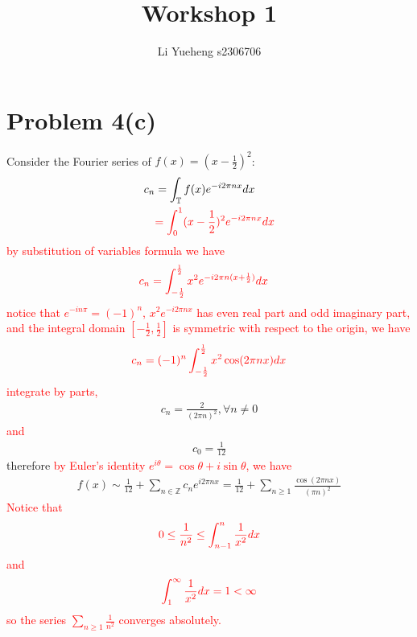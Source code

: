 \documentclass{article}
\begin{document}
\title{Workshop 1}
\author{Li Yueheng s2306706}


\maketitle


\section*{Problem 4(c)}

Consider the Fourier series of $f(x)=(x-\frac{1}{2})^2$:
\begin{align*}
	c_n&=\int_{\mathbb{T}}f(x)e^{-i2\pi nx}dx \\
	&\textcolor{red}{=\int_{0}^{1}(x-\frac{1}{2} )^2e^{-i2\pi nx}dx}
	\end{align*}
	\textcolor{red} {by substitution of variables formula we have}
	\begin{align*}
	&\textcolor{red}{c_n=\int_{-\frac{1}{2}}^{\frac{1}{2}}x^2 e^{-i2\pi n(x+\frac{1}{2} )}dx}
	\end{align*}
	\textcolor{red}{notice that $e^{-in\pi}=(-1)^n$, $x^2e^{-i2\pi nx}$ has even real part and odd imaginary part, and the integral domain $[-\frac{1}{2},\frac{1}{2} ]$ is symmetric with respect to the origin, we have}
	\begin{align*}
	\textcolor{red}{c_n=(-1)^{n}\int_{-\frac{1}{2}}^{\frac{1}{2}}x^2\cos(2\pi nx)dx}
	\end{align*}
	\textcolor{red}{integrate by parts,}
	\begin{align*}
	c_n=\frac{2}{(2\pi n)^2} ,\forall n\neq 0
	\end{align*}
	\textcolor{red}{and}
	\begin{align*}
	c_0=\frac{1}{12}
\end{align*}
therefore \textcolor{red}{by Euler's identity $e^{i\theta}=\cos\theta+i\sin\theta$, we have}
\begin{align}\label{1}
	f(x)\sim \frac{1}{12}+\sum_{n\in\mathbb{Z}}c_ne^{i2\pi nx}=\frac{1}{12}+\sum_{n\geq 1}\frac{\cos(2\pi nx)}{(\pi n)^2}
\end{align}
\textcolor{red}{Notice that}
\begin{align*}
	\textcolor{red}{0\leq\frac{1}{n^2}\leq\int_{n-1}^{n}\frac{1}{x^2}dx}
	\end{align*}
	\textcolor{red}{and}
	\begin{align*}
	\textcolor{red}{\int_{1}^{\infty}\frac{
	1}{x^2}dx=1 <\infty}
\end{align*}
\textcolor{red}{so the series $\sum_{n\geq 1}\frac{1}{n^2}$ converges absolutely.}
\end{document}
